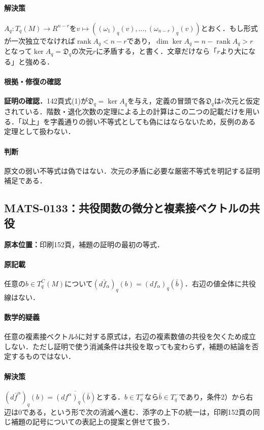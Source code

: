 \documentclass[a4paper,10pt]{ltjsarticle}
\begin{document}
\paragraph{解決策}$A_q:T_q(M)\to R^{n-r}$を$v\mapsto((\omega_1)_q(v),\ldots,(\omega_{n-r})_q(v))$とおく．もし形式が一次独立でなければ$\operatorname{rank}A_q<n-r$であり，$\dim\ker A_q=n-\operatorname{rank}A_q>r$となって$\ker A_q=\mathfrak D_q$の次元$r$に矛盾する，と書く．文章だけなら「$r$より大になる」と強める．

\paragraph{根拠・修復の確認}\textbf{証明の確認．}142頁式(1)が$\mathfrak D_q=\ker A_q$を与え，定義の冒頭で各$\mathfrak D_q$は$r$次元と仮定されている．階数・退化次数の定理による上の計算はこの二つの記載だけを用いる．「以上」を字義通りの弱い不等式としても偽にはならないため，反例のある定理として扱わない．

\paragraph{判断}原文の弱い不等式は偽ではない．次元の矛盾に必要な厳密不等式を明記する証明補足である．


\subsection*{MATS-0133：共役関数の微分と複素接ベクトルの共役}\label{math:MATS-0133}
\noindent\textbf{原本位置：}印刷152頁，補題の証明の最初の等式．

\paragraph{原記載}任意の$b\in T_q^C(M)$について$(d\bar f_\alpha)_q(b)=(df_\alpha)_q(\bar b)$．右辺の値全体に共役線はない．

\paragraph{数学的疑義}任意の複素接ベクトル$b$に対する原式は，右辺の複素数値の共役を欠くため成立しない．ただし証明で使う消滅条件は共役を取っても変わらず，補題の結論を否定するものではない．

\paragraph{解決策}$(d\bar f^\alpha)_q(b)=\overline{(df^\alpha)_q(\bar b)}$とする．$b\in T_q^+$なら$\bar b\in T_q^-$であり，条件2）から右辺は0である，という形で次の消滅へ進む．添字の上下の統一は，印刷152頁の同じ補題の記号についての表記上の提案と併せて扱う．
\end{document}
